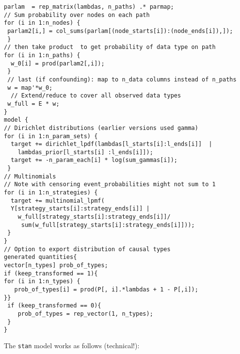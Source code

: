 \documentclass[
  12pt,
]{book}
\begin{document}
\begin{verbatim}
parlam  = rep_matrix(lambdas, n_paths) .* parmap;
// Sum probability over nodes on each path
for (i in 1:n_nodes) {
 parlam2[i,] = col_sums(parlam[(node_starts[i]):(node_ends[i]),]);
 }
// then take product  to get probability of data type on path
for (i in 1:n_paths) {
  w_0[i] = prod(parlam2[,i]);
 }
 // last (if confounding): map to n_data columns instead of n_paths
 w = map'*w_0;
  // Extend/reduce to cover all observed data types
 w_full = E * w;
}
model {
// Dirichlet distributions (earlier versions used gamma)
for (i in 1:n_param_sets) {
  target += dirichlet_lpdf(lambdas[l_starts[i]:l_ends[i]]  |
    lambdas_prior[l_starts[i] :l_ends[i]]);
  target += -n_param_each[i] * log(sum_gammas[i]);
 }
// Multinomials
// Note with censoring event_probabilities might not sum to 1
for (i in 1:n_strategies) {
  target += multinomial_lpmf(
  Y[strategy_starts[i]:strategy_ends[i]] |
    w_full[strategy_starts[i]:strategy_ends[i]]/
     sum(w_full[strategy_starts[i]:strategy_ends[i]]));
 }
}
// Option to export distribution of causal types
generated quantities{
vector[n_types] prob_of_types;
if (keep_transformed == 1){
for (i in 1:n_types) {
   prob_of_types[i] = prod(P[, i].*lambdas + 1 - P[,i]);
}}
 if (keep_transformed == 0){
    prob_of_types = rep_vector(1, n_types);
 }
}
\end{verbatim}

The \texttt{stan} model works as follows (technical!):
\end{document}
